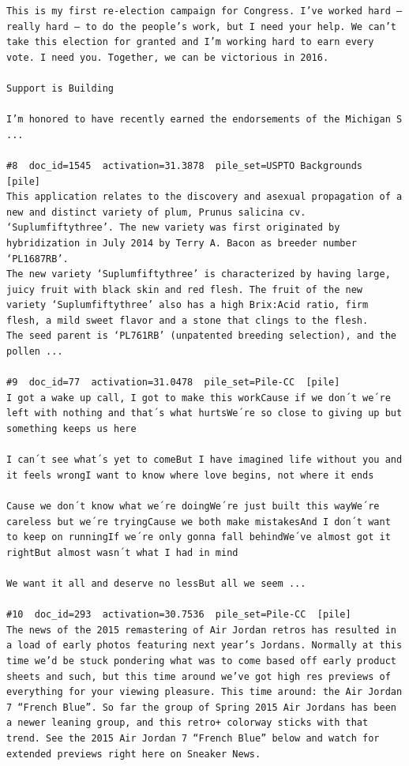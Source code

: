 \begin{verbatim}
This is my first re-election campaign for Congress. I’ve worked hard — really hard — to do the people’s work, but I need your help. We can’t take this election for granted and I’m working hard to earn every vote. I need you. Together, we can be victorious in 2016.

Support is Building

I’m honored to have recently earned the endorsements of the Michigan S ...

#8  doc_id=1545  activation=31.3878  pile_set=USPTO Backgrounds  [pile]
This application relates to the discovery and asexual propagation of a new and distinct variety of plum, Prunus salicina cv. ‘Suplumfiftythree’. The new variety was first originated by hybridization in July 2014 by Terry A. Bacon as breeder number ‘PL1687RB’.
The new variety ‘Suplumfiftythree’ is characterized by having large, juicy fruit with black skin and red flesh. The fruit of the new variety ‘Suplumfiftythree’ also has a high Brix:Acid ratio, firm flesh, a mild sweet flavor and a stone that clings to the flesh.
The seed parent is ‘PL761RB’ (unpatented breeding selection), and the pollen ...

#9  doc_id=77  activation=31.0478  pile_set=Pile-CC  [pile]
I got a wake up call, I got to make this workCause if we don´t we´re left with nothing and that´s what hurtsWe´re so close to giving up but something keeps us here

I can´t see what´s yet to comeBut I have imagined life without you and it feels wrongI want to know where love begins, not where it ends

Cause we don´t know what we´re doingWe´re just built this wayWe´re careless but we´re tryingCause we both make mistakesAnd I don´t want to keep on runningIf we´re only gonna fall behindWe´ve almost got it rightBut almost wasn´t what I had in mind

We want it all and deserve no lessBut all we seem ...

#10  doc_id=293  activation=30.7536  pile_set=Pile-CC  [pile]
The news of the 2015 remastering of Air Jordan retros has resulted in a load of early photos featuring next year’s Jordans. Normally at this time we’d be stuck pondering what was to come based off early product sheets and such, but this time around we’ve got high res previews of everything for your viewing pleasure. This time around: the Air Jordan 7 “French Blue”. So far the group of Spring 2015 Air Jordans has been a newer leaning group, and this retro+ colorway sticks with that trend. See the 2015 Air Jordan 7 “French Blue” below and watch for extended previews right here on Sneaker News.

\end{verbatim}

